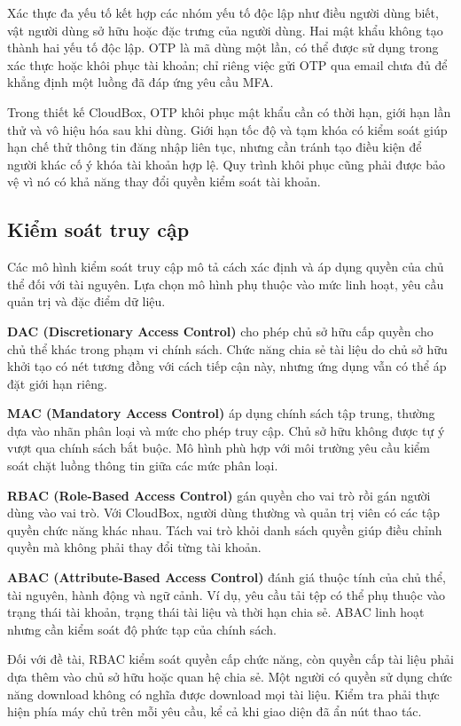 Xác thực đa yếu tố kết hợp các nhóm yếu tố độc lập như điều người dùng biết, vật người dùng sở hữu hoặc đặc trưng của người dùng. Hai mật khẩu không tạo thành hai yếu tố độc lập. OTP là mã dùng một lần, có thể được sử dụng trong xác thực hoặc khôi phục tài khoản; chỉ riêng việc gửi OTP qua email chưa đủ để khẳng định một luồng đã đáp ứng yêu cầu MFA.\cite{auth}

Trong thiết kế CloudBox, OTP khôi phục mật khẩu cần có thời hạn, giới hạn lần thử và vô hiệu hóa sau khi dùng. Giới hạn tốc độ và tạm khóa có kiểm soát giúp hạn chế thử thông tin đăng nhập liên tục, nhưng cần tránh tạo điều kiện để người khác cố ý khóa tài khoản hợp lệ. Quy trình khôi phục cũng phải được bảo vệ vì nó có khả năng thay đổi quyền kiểm soát tài khoản.

\subsection{Kiểm soát truy cập}
Các mô hình kiểm soát truy cập mô tả cách xác định và áp dụng quyền của chủ thể đối với tài nguyên. Lựa chọn mô hình phụ thuộc vào mức linh hoạt, yêu cầu quản trị và đặc điểm dữ liệu.

\textbf{DAC (Discretionary Access Control)} cho phép chủ sở hữu cấp quyền cho chủ thể khác trong phạm vi chính sách. Chức năng chia sẻ tài liệu do chủ sở hữu khởi tạo có nét tương đồng với cách tiếp cận này, nhưng ứng dụng vẫn có thể áp đặt giới hạn riêng.

\textbf{MAC (Mandatory Access Control)} áp dụng chính sách tập trung, thường dựa vào nhãn phân loại và mức cho phép truy cập. Chủ sở hữu không được tự ý vượt qua chính sách bắt buộc. Mô hình phù hợp với môi trường yêu cầu kiểm soát chặt luồng thông tin giữa các mức phân loại.

\textbf{RBAC (Role-Based Access Control)} gán quyền cho vai trò rồi gán người dùng vào vai trò. Với CloudBox, người dùng thường và quản trị viên có các tập quyền chức năng khác nhau. Tách vai trò khỏi danh sách quyền giúp điều chỉnh quyền mà không phải thay đổi từng tài khoản.

\textbf{ABAC (Attribute-Based Access Control)} đánh giá thuộc tính của chủ thể, tài nguyên, hành động và ngữ cảnh. Ví dụ, yêu cầu tải tệp có thể phụ thuộc vào trạng thái tài khoản, trạng thái tài liệu và thời hạn chia sẻ. ABAC linh hoạt nhưng cần kiểm soát độ phức tạp của chính sách.

Đối với đề tài, RBAC kiểm soát quyền cấp chức năng, còn quyền cấp tài liệu phải dựa thêm vào chủ sở hữu hoặc quan hệ chia sẻ. Một người có quyền sử dụng chức năng download không có nghĩa được download mọi tài liệu. Kiểm tra phải thực hiện phía máy chủ trên mỗi yêu cầu, kể cả khi giao diện đã ẩn nút thao tác.\cite{authorization}

